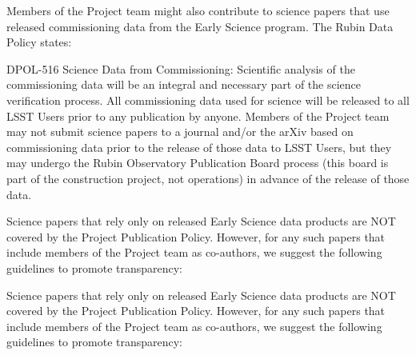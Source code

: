 \documentclass[SE,authoryear,toc,lsstdraft]{lsstdoc}
\begin{document}
Members of the Project team might also contribute to science papers that use released commissioning data from the Early Science program. The Rubin Data Policy  states:

\begin{emph}
  DPOL-516 Science Data from Commissioning: Scientific analysis of the commissioning data will be an integral and necessary part of the science verification process.
  All commissioning data used for science will be released to all LSST Users prior to any publication by anyone.
  Members of the Project team may not submit science papers to a journal and/or the arXiv based on commissioning data prior to the release of those data to LSST Users, but they may undergo the Rubin Observatory Publication Board process (this board is part of the construction project, not operations) in advance of the release of those data.
\end{emph}

Science papers that rely only on released Early Science data products are NOT covered by the Project Publication Policy.
However, for any such papers that include members of the Project team as co-authors, we suggest the following guidelines to promote transparency:

Science papers that rely only on released Early Science data products are NOT covered by the Project Publication Policy.
However, for any such papers that include members of the Project team as co-authors, we suggest the following guidelines to promote transparency:
\end{document}
